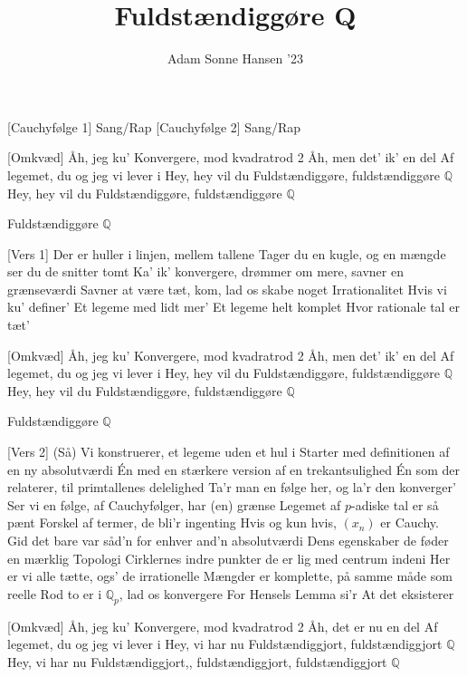 \documentclass[a4paper,11pt]{article}
\title{Fuldstændiggøre Q}
\author{Adam Sonne Hansen '23}
\begin{document}
\maketitle

\begin{roles}
[Cauchyfølge 1] Sang/Rap
[Cauchyfølge 2] Sang/Rap
\end{roles}

\begin{song}
\sings{}[Omkvæd]
  Åh, jeg ku'
  Konvergere, mod kvadratrod 2
  Åh, men det' ik' en del
  Af legemet, du og jeg vi lever i
  Hey, hey vil du
  Fuldstændiggøre, fuldstændiggøre $\mathbb{Q}$
  Hey, hey vil du
  Fuldstændiggøre, fuldstændiggøre $\mathbb{Q}$

Fuldstændiggøre $\mathbb{Q}$

  \sings{}[Vers 1]
Der er huller i linjen, mellem tallene
Tager du en kugle, og en mængde ser du de snitter tomt
Ka' ik' konvergere, drømmer om mere, savner en grænseværdi
Savner at være tæt, kom, lad os skabe noget
Irrationalitet
Hvis vi ku' definer'
Et legeme med lidt mer'
Et legeme helt komplet
Hvor rationale tal er tæt'

\sings{}[Omkvæd]
  Åh, jeg ku'
  Konvergere, mod kvadratrod 2
  Åh, men det' ik' en del
  Af legemet, du og jeg vi lever i
  Hey, hey vil du
  Fuldstændiggøre, fuldstændiggøre $\mathbb{Q}$
  Hey, hey vil du
  Fuldstændiggøre, fuldstændiggøre $\mathbb{Q}$

  Fuldstændiggøre $\mathbb{Q}$
  
\sings{}[Vers 2]
(Så) Vi konstruerer, et legeme uden et hul i
Starter med definitionen af en ny  absolutværdi
Én med en stærkere version af en trekantsulighed
Én som der relaterer, til primtallenes delelighed
Ta'r man en følge her, og la'r den konverger'
Ser vi en følge, af Cauchyfølger, har (en) grænse
Legemet af $p$-adiske tal er så pænt 
Forskel af termer, de bli'r ingenting 
Hvis og kun hvis, $(x_n)$ er Cauchy.
Gid det bare var såd'n for enhver and'n absolutværdi
Dens egenskaber de føder en mærklig Topologi
Cirklernes indre punkter de er lig med centrum indeni
Her er vi alle tætte, ogs' de irrationelle 
Mængder er komplette, på samme måde som reelle
Rod to er i $\mathbb{Q}_p$, lad os konvergere
For Hensels Lemma si'r
At det eksisterer

\sings{}[Omkvæd]
  Åh, jeg ku'
  Konvergere, mod kvadratrod 2
  Åh, det er nu en del
  Af legemet, du og jeg vi lever i
  Hey, vi har nu
  Fuldstændiggjort, fuldstændiggjort $\mathbb{Q}$
  Hey, vi har nu
  Fuldstændiggjort,, fuldstændiggjort, fuldstændiggjort $\mathbb{Q}$
\end{song}
\end{document}
